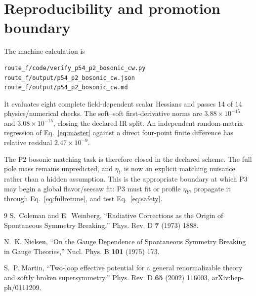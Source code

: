 \documentclass[11pt]{article}
\begin{document}
\section{Reproducibility and promotion boundary}

The machine calculation is
\begin{verbatim}
route_f/code/verify_p54_p2_bosonic_cw.py
route_f/output/p54_p2_bosonic_cw.json
route_f/output/p54_p2_bosonic_cw.md
\end{verbatim}
It evaluates eight complete field-dependent scalar Hessians and passes 14 of
14 physics/numerical checks.  The soft--soft first-derivative norms are
\(3.88\times10^{-15}\) and \(3.08\times10^{-15}\), closing the declared IR
split.  An independent random-matrix regression of Eq.~\eqref{eq:master}
against a direct four-point finite difference has relative residual
\(2.47\times10^{-9}\).

The P2 bosonic matching task is therefore closed in the declared scheme.
The full pole mass remains unpredicted, and \(\eta_Y\) is now an explicit
matching nuisance rather than a hidden assumption.  This is the appropriate
boundary at which P3 may begin a global flavor/seesaw fit: P3 must fit or
profile \(\eta_Y\), propagate it through Eq.~\eqref{eq:fullretune}, and test
Eq.~\eqref{eq:safety}.

\begin{thebibliography}{9}
S.~Coleman and E.~Weinberg,
``Radiative Corrections as the Origin of Spontaneous Symmetry Breaking,''
Phys. Rev. D \textbf{7} (1973) 1888.

N.~K. Nielsen,
``On the Gauge Dependence of Spontaneous Symmetry Breaking in Gauge
Theories,'' Nucl. Phys. B \textbf{101} (1975) 173.

S.~P. Martin,
``Two-loop effective potential for a general renormalizable theory and
softly broken supersymmetry,'' Phys. Rev. D \textbf{65} (2002) 116003,
arXiv:hep-ph/0111209.
\end{thebibliography}
\end{document}
